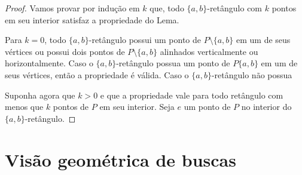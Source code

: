 \begin{proof}

    Vamos provar por indução em $k$ que, todo $\{a,b\}$-retângulo com $k$ pontos em seu interior satisfaz a propriedade do Lema.

    Para $k = 0$, todo $\{a,b\}$-retângulo possui um ponto de $P \setminus \{a,b\}$ em um de seus vértices ou possui dois pontos de $P \setminus \{a,b\}$ alinhados verticalmente ou horizontalmente. Caso o $\{a,b\}$-retângulo possua um ponto de $P\{a,b\}$ em um de seus vértices, então a propriedade é válida. Caso o $\{a,b\}$-retângulo não possua 

    Suponha agora que $k > 0$ e que a propriedade vale para todo retângulo com menos que $k$ pontos de $P$ em seu interior. Seja $e$ um ponto de $P$ no interior do $\{a,b\}$-retângulo. 

    
\end{proof}


\section{Visão geométrica de buscas}

